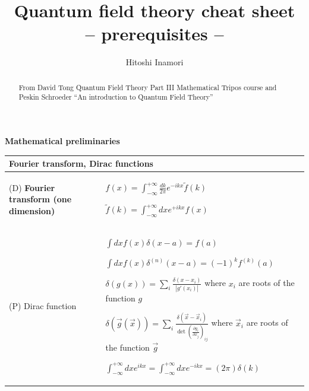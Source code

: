 \documentclass[11pt,amsmath,amssymb,latexsym]{article}
\newcommand{\toshTableBegin} 			{\begin{tabular}{|p{5cm}|p{11cm}|}}
\newcommand{\toshTableEnd} 				{\hline \end{tabular}}
\newcommand{\toshTableTitle}[1] 	{\hline \multicolumn{2}{|l|}{{\bf{#1}}}\\ \hline}
\newcommand{\toshDefinition}[2]		{\hline (D) {\bf{#1}} & {#2} \\}
\newcommand{\toshProperty}[2]			{\hline (P) {#1} & {#2} \\}
\begin{document}
\title{Quantum field theory cheat sheet\\ -- prerequisites -- }
\author{Hitoshi Inamori}
\maketitle
\begin{abstract}
From David Tong Quantum Field Theory Part III Mathematical Tripos course and Peskin Schroeder ``An introduction to Quantum Field Theory''
\end{abstract}


\textbf{Mathematical preliminaries}
\bigskip



\toshTableBegin
\toshTableTitle{Fourier transform, Dirac functions}
\toshDefinition{Fourier transform (one dimension)}{
\quad $\displaystyle f(x) = \int_{-\infty}^{+\infty}\frac{d k}{2\pi} e^{-i k x}\tilde{f}(k)$

\quad $\displaystyle \tilde{f}(k) = \int_{-\infty}^{+\infty}d x e^{+i k x}f(x)$
}
\toshProperty{Dirac function}{
\quad $\displaystyle\int d x f(x)\delta(x-a) = f(a)$

\quad $\displaystyle\int d x f(x)\delta^{(n)}(x-a) = (-1)^k f^{(k)}(a)$

\quad $\displaystyle\delta(g(x)) = \sum_i\frac{\delta(x-x_i)}{|g'(x_i)|}$ where $x_i$ are roots of the function $g$

\quad $\displaystyle\delta(\vec{g}(\vec{x})) = \sum_i\frac{\delta(\vec{x}-\vec{x}_i)}{\det\left(\frac{\partial g_i}{\partial x_j}\right)_{ij}}$ where $\vec{x}_i$ are roots of the function $\vec{g}$

\quad $\displaystyle\int_{-\infty}^{+\infty} dx e^{ikx} = \int_{-\infty}^{+\infty} dx e^{-ikx} = (2\pi) \delta(k)$
}
\toshTableEnd
\bigskip

\end{document}
